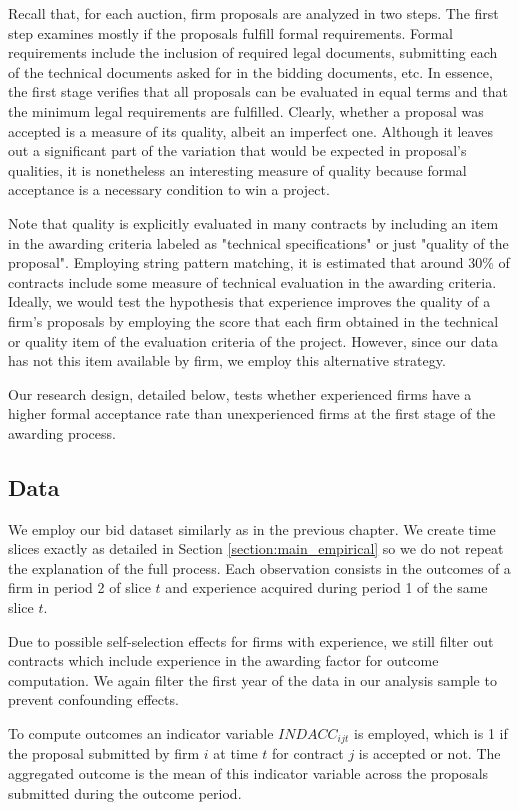Recall that, for each auction, firm proposals are analyzed in two steps. The first step examines mostly if the proposals fulfill formal requirements. Formal requirements include the inclusion of required legal documents, submitting each of the technical documents asked for in the bidding documents, etc. In essence, the first stage verifies that all proposals can be evaluated in equal terms and that the minimum legal requirements are fulfilled. Clearly, whether a proposal was accepted is a measure of its quality, albeit an imperfect one. Although it leaves out a significant part of the variation that would be expected in proposal's qualities, it is nonetheless an interesting measure of quality because formal acceptance is a necessary condition to win a project.

Note that quality is explicitly evaluated in many contracts by including an item in the awarding criteria labeled as "technical specifications" or just "quality of the proposal". Employing string pattern matching, it is estimated that around 30\% of contracts include some measure of technical evaluation in the awarding criteria.  Ideally, we would test the hypothesis that experience improves the quality of a firm's proposals by employing the score that each firm obtained in the technical or quality item of the evaluation criteria of the project. However, since our data has not this item available by firm, we employ this alternative strategy.

Our research design, detailed below, tests whether experienced firms have a higher formal acceptance rate than unexperienced firms at the first stage of the awarding process.

\subsection{Data}
We employ our bid dataset similarly as in the previous chapter. We create time slices exactly as detailed in Section \ref{section:main_empirical} so we do not repeat the explanation of the full process.  Each observation consists in the outcomes of a firm in period 2 of slice $t$ and experience acquired during period 1 of the same slice $t$.

 Due to possible self-selection effects for firms with experience, we still filter out contracts which include experience in the awarding factor for outcome computation. We again filter the first year of the data in our analysis sample to prevent confounding effects.

To compute outcomes an indicator variable $INDACC_{ijt}$ is employed, which is 1 if the proposal submitted by firm $i$ at time $t$ for contract $j$ is accepted or not. The aggregated outcome is the mean of this indicator variable across the proposals submitted during the outcome period.

